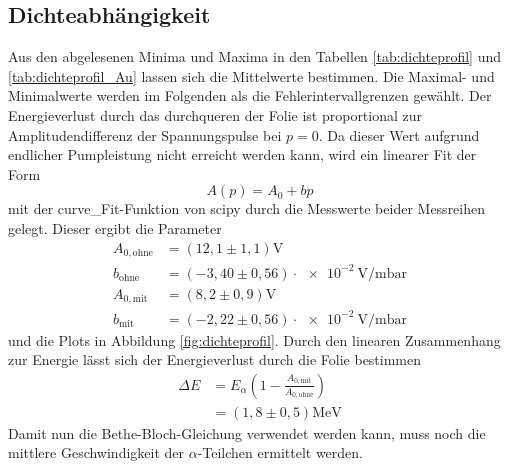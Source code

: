 %
\subsection{Dichteabhängigkeit}
Aus den abgelesenen Minima und Maxima in den Tabellen \ref{tab:dichteprofil} und \ref{tab:dichteprofil_Au} lassen sich die Mittelwerte bestimmen.
Die Maximal- und Minimalwerte werden im Folgenden als die Fehlerintervallgrenzen gewählt.
Der Energieverlust durch das durchqueren der Folie ist proportional zur Amplitudendifferenz der Spannungspulse bei $p=0$.
Da dieser Wert aufgrund endlicher Pumpleistung nicht erreicht werden kann,
wird ein linearer Fit der Form
\begin{equation}
  A(p) = A_0 + bp
\end{equation}
mit der curve\_Fit-Funktion von scipy \cite{scipy} durch die Messwerte beider Messreihen gelegt.
Dieser ergibt die Parameter
\begin{align}
  A_{0,\text{ohne}} &= (12,1 \pm 1,1)\si{\volt}\\
  b_{\text{ohne}}   &= (-3,40 \pm 0,56)\cdot\SI{e-2}{\volt\per\milli\bar}\\
  A_{0,\text{mit}} &= (8,2 \pm 0,9)\si{\volt}\\
  b_{\text{mit}}   &= (-2,22 \pm 0,56)\cdot\SI{e-2}{\volt\per\milli\bar}
\end{align}
und die Plots in Abbildung \ref{fig:dichteprofil}.
Durch den linearen Zusammenhang zur Energie lässt sich der Energieverlust durch die Folie bestimmen
\begin{align}
  \Delta E &= E_{\alpha}\left(1-\frac{A_{0,\text{mit}}}{A_{0,\text{ohne}}}\right)\\
           &= (1,8 \pm 0,5)\si{\mega\electronvolt}
\end{align}
Damit nun die Bethe-Bloch-Gleichung verwendet werden kann, muss noch die mittlere Geschwindigkeit der $\alpha$-Teilchen ermittelt werden.
